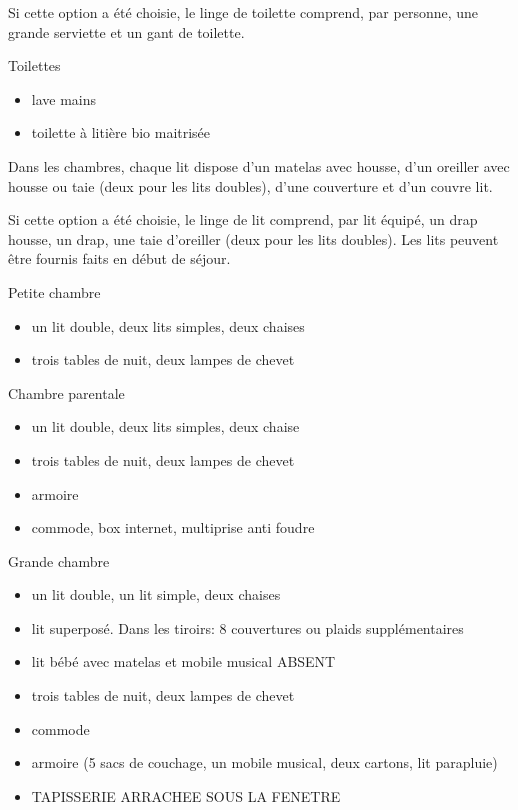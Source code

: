 \documentclass[a4paper,11pt]{article}
\begin{document}
Si cette option a été choisie, le linge de toilette comprend, par personne, une grande serviette et un gant de toilette.
\vspace{0.5cm}

Toilettes
\begin{itemize}
\item lave mains
\item toilette à litière bio maitrisée
\end{itemize}


\vspace{0.25cm}

Dans les chambres, chaque lit dispose d'un matelas avec housse, d'un oreiller avec housse ou taie (deux pour les lits doubles),  d'une couverture et d'un couvre lit.

Si cette option a été choisie, le linge de lit comprend, par lit équipé, un drap housse, un drap, une taie d'oreiller (deux pour les lits doubles). Les lits peuvent être fournis faits en début de séjour.
\vspace{0.5cm}

Petite chambre
\begin{itemize}
\item un lit double, deux lits simples, deux chaises
\item trois tables de nuit, deux lampes de chevet 
\end{itemize}
\vspace{0.25cm}

Chambre parentale
\begin{itemize}
\item un lit double, deux lits simples, deux chaise
\item trois tables de nuit, deux lampes de chevet 
\item armoire 
\item commode, box internet, multiprise anti foudre
\end{itemize}

\vspace{0.5cm}

Grande chambre
\begin{itemize}
\item un lit double, un lit simple, deux chaises
\item lit superposé. Dans les tiroirs: 8 couvertures ou plaids supplémentaires
\item lit bébé avec matelas et mobile musical ABSENT
\item trois tables de nuit, deux lampes de chevet
\item commode
\item armoire (5 sacs de couchage, un mobile musical, deux cartons, lit parapluie)
\item TAPISSERIE ARRACHEE SOUS LA FENETRE
\end{itemize}
\end{document}
